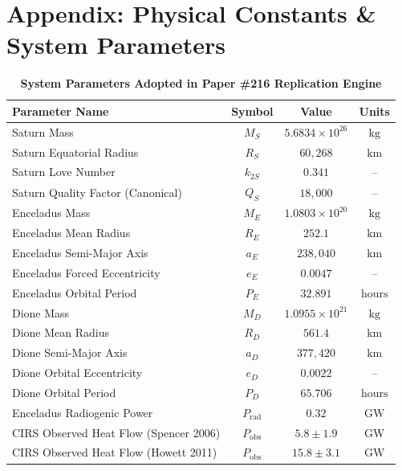 \documentclass[11pt,a4paper]{article}
\begin{document}
\section*{Appendix: Physical Constants \& System Parameters}
\begin{table}[H]
\centering
\caption{\textbf{System Parameters Adopted in Paper \#216 Replication Engine}}
\begin{tabular}{lccc}
\toprule
\textbf{Parameter Name} & \textbf{Symbol} & \textbf{Value} & \textbf{Units} \\
\midrule
Saturn Mass & $M_S$ & $5.6834 \times 10^{26}$ & $\text{kg}$ \\
Saturn Equatorial Radius & $R_S$ & $60,268$ & $\text{km}$ \\
Saturn Love Number & $k_{2S}$ & $0.341$ & -- \\
Saturn Quality Factor (Canonical) & $Q_S$ & $18,000$ & -- \\
Enceladus Mass & $M_E$ & $1.0803 \times 10^{20}$ & $\text{kg}$ \\
Enceladus Mean Radius & $R_E$ & $252.1$ & $\text{km}$ \\
Enceladus Semi-Major Axis & $a_E$ & $238,040$ & $\text{km}$ \\
Enceladus Forced Eccentricity & $e_E$ & $0.0047$ & -- \\
Enceladus Orbital Period & $P_E$ & $32.891$ & $\text{hours}$ \\
Dione Mass & $M_D$ & $1.0955 \times 10^{21}$ & $\text{kg}$ \\
Dione Mean Radius & $R_D$ & $561.4$ & $\text{km}$ \\
Dione Semi-Major Axis & $a_D$ & $377,420$ & $\text{km}$ \\
Dione Orbital Eccentricity & $e_D$ & $0.0022$ & -- \\
Dione Orbital Period & $P_D$ & $65.706$ & $\text{hours}$ \\
Enceladus Radiogenic Power & $P_{\text{rad}}$ & $0.32$ & $\text{GW}$ \\
CIRS Observed Heat Flow (Spencer 2006) & $P_{\text{obs}}$ & $5.8 \pm 1.9$ & $\text{GW}$ \\
CIRS Observed Heat Flow (Howett 2011) & $P_{\text{obs}}$ & $15.8 \pm 3.1$ & $\text{GW}$ \\
\bottomrule
\end{tabular}
\end{table}
\end{document}
